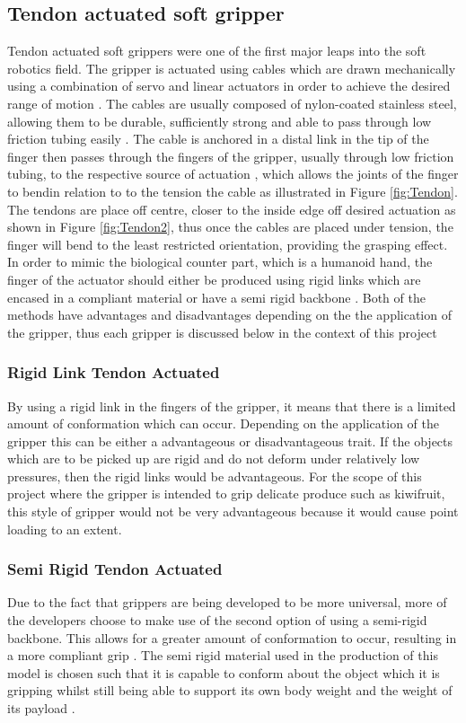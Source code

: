 \documentclass[11pt]{article}
\begin{document}
\subsection{Tendon actuated soft gripper}
Tendon actuated soft grippers were one of the first major leaps into the soft robotics field. The gripper is actuated using cables which are drawn mechanically using a combination of servo and linear actuators in order to achieve the desired range of motion \cite{marchese2015recipe}. The cables are usually composed of nylon-coated stainless steel, allowing them to be durable, sufficiently strong and able to pass through low friction tubing easily \cite{dollar2010contact}. The cable is anchored in a distal link in the tip of the finger then passes through the fingers of the gripper, usually through low friction tubing, to the respective source of actuation \cite{dollar2010contact}, which allows the joints of the finger to bendin relation to to the tension the cable as illustrated in Figure \ref{fig:Tendon}. The tendons are place off centre, closer to the inside edge off desired actuation as shown in Figure \ref{fig:Tendon2}, thus once the cables are placed under tension, the finger will bend to the least restricted orientation, providing the grasping effect. In order to mimic the biological counter part, which is a humanoid hand, the finger of the actuator should either be produced using rigid links which are encased in a compliant material or have a semi rigid backbone \cite{mutlu2016mechanical}. Both of the methods have advantages and disadvantages depending on the the application of the gripper, thus each gripper is discussed below in the context of this project
\subsubsection{Rigid Link Tendon Actuated}
By using a rigid link in the fingers of the gripper, it means that there is a limited amount of conformation which can occur. Depending on the application of the gripper this can be either a advantageous or disadvantageous trait. If the objects which are to be picked up are rigid and do not deform under relatively low pressures, then the rigid links would be advantageous. For the scope of this project where the gripper is intended to grip delicate produce such as kiwifruit, this style of gripper would not be very advantageous because it would cause point loading to an extent.

\subsubsection{Semi Rigid Tendon Actuated}
Due to the fact that grippers are being developed to be more universal, more of the developers choose to make use of the second option of using a semi-rigid backbone. This allows for a greater amount of conformation to occur, resulting in a more compliant grip \cite{marchese2015recipe} . The semi rigid material used in the production of this model is chosen such that it is capable to conform about the object which it is gripping whilst still being able to support its own body weight and the weight of its payload \cite{hassan2015design}.
\end{document}
